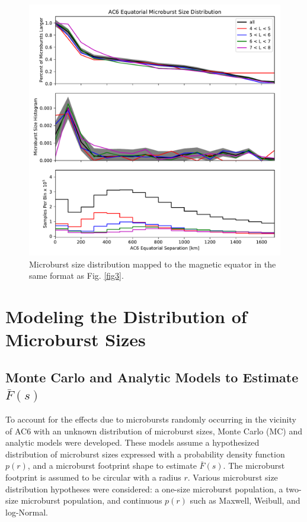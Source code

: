 \documentclass[draft]{agujournal2019}
\begin{document}
\begin{figure}
\includegraphics[width=\textwidth]{fig4.pdf}
\caption{Microburst size distribution mapped to the magnetic equator in the same format as Fig. \ref{fig3}.} 
\label{fig4}
\end{figure}

\section{Modeling the Distribution of Microburst Sizes} \label{model_section}
\subsection{Monte Carlo and Analytic Models to Estimate $\bar{F}(s)$}
To account for the effects due to microbursts randomly occurring in the vicinity of AC6 with an unknown distribution of microburst sizes, Monte Carlo (MC) and analytic models were developed. These models assume a hypothesized distribution of microburst sizes expressed with a probability density function $p(r)$, and a microburst footprint shape to estimate $\bar{F}(s)$. The microburst footprint is assumed to be circular with a radius $r$. Various microburst size distribution hypotheses were considered: a one-size microburst population, a two-size microburst population, and continuous $p(r)$ such as Maxwell, Weibull, and log-Normal.
\end{document}
